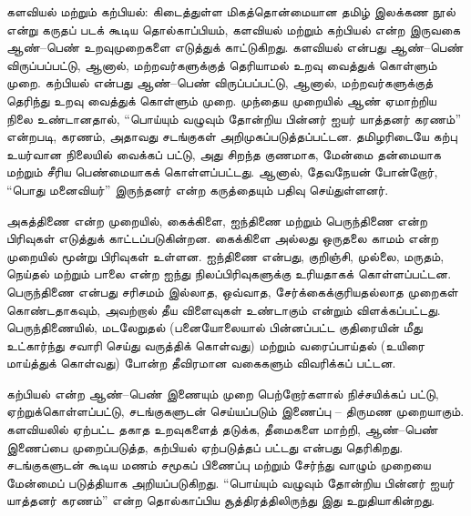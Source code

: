 களவியல் மற்றும் கற்பியல்: கிடைத்துள்ள மிகத்தொன்மையான தமிழ் இலக்கண நூல் என்று கருதப் படக் கூடிய தொல்காப்பியம், களவியல் மற்றும் கற்பியல் என்ற இருவகை ஆண்–பெண் உறவுமுறைகளை எடுத்துக் காட்டுகிறது. களவியல் என்பது ஆண்–பெண் விருப்பப்பட்டு, ஆனால், மற்றவர்களுக்குத் தெரியாமல் உறவு வைத்துக் கொள்ளும் முறை. கற்பியல் என்பது ஆண்–பெண் விருப்பப்பட்டு, ஆனால், மற்றவர்களுக்குத் தெரிந்து உறவு வைத்துக் கொள்ளும் முறை. முந்தைய முறையில் ஆண் ஏமாற்றிய நிலை உண்டானதால், “பொய்யும் வழுவும் தோன்றிய பின்னர் ஐயர் யாத்தனர் கரணம்” என்றபடி, கரணம், அதாவது சடங்குகள் அறிமுகப்படுத்தப்பட்டன. தமிழரிடையே கற்பு உயர்வான நிலையில் வைக்கப் பட்டு, அது சிறந்த குணமாக, மேன்மை தன்மையாக மற்றும் சீரிய பெண்மையாகக் கொள்ளப்பட்டது. ஆனால், தேவநேயன் போன்றோர், “பொது மனைவியர்” இருந்தனர் என்ற கருத்தையும் பதிவு செய்துள்ளனர்.

அகத்திணை என்ற முறையில், கைக்கிளை, ஐந்திணை மற்றும் பெருந்திணை என்ற பிரிவுகள் எடுத்துக் காட்டப்படுகின்றன. கைக்கிளை அல்லது ஒருதலை காமம் என்ற முறையில் மூன்று பிரிவுகள் உள்ளன. ஐந்திணை என்பது, குறிஞ்சி, முல்லை, மருதம், நெய்தல் மற்றும் பாலை என்ற ஐந்து நிலப்பிரிவுகளுக்கு உரியதாகக் கொள்ளப்பட்டன. பெருந்திணை என்பது சரிசமம் இல்லாத, ஒவ்வாத, சேர்க்கைக்குரியதல்லாத முறைகள் கொண்டதாகவும், அவற்றால் தீய விளைவுகள் உண்டாகும் என்றும் விளக்கப்பட்டது. பெருந்திணையில், மடலேறுதல் (பனையோலையால் பின்னப்பட்ட குதிரையின் மீது உட்கார்ந்து சவாரி செய்து வருத்திக் கொள்வது) மற்றும் வரைப்பாய்தல் (உயிரை மாய்த்துக் கொள்வது) போன்ற தீவிரமான வகைகளும் விவரிக்கப் பட்டன.

கற்பியல் என்ற ஆண்–பெண் இணையும் முறை பெற்றோர்களால் நிச்சயிக்கப் பட்டு, ஏற்றுக்கொள்ளப்பட்டு, சடங்குகளுடன் செய்யப்படும் இணைப்பு – திருமண முறையாகும். களவியலில் ஏற்பட்ட தகாத உறவுகளைத் தடுக்க, தீமைகளை மாற்றி, ஆண்–பெண் இணைப்பை முறைப்படுத்த, கற்பியல் ஏற்படுத்தப் பட்டது என்பது தெரிகிறது. சடங்குகளுடன் கூடிய மணம் சமூகப் பிணைப்பு மற்றும் சேர்ந்து வாழும் முறையை மேன்மைப் படுத்தியாக அறியப்படுகிறது. “பொய்யும் வழுவும் தோன்றிய பின்னர் ஐயர் யாத்தனர் கரணம்” என்ற தொல்காப்பிய சூத்திரத்திலிருந்து இது உறுதியாகின்றது.

